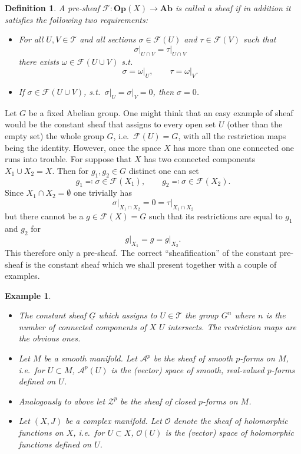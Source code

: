 \documentclass[11pt]{preprint}
\newtheorem{example}[lemma]{Example}
\newtheorem{defn}[lemma]{Definition}
\def\cA{\mathscr{A}}
\def\cZ{\mathscr{Z}}
\def\Op{\mathord{\mathbf{Op}}}
\def\Ab{\mathord{\mathbf{Ab}}}
\numberwithin{equation}{section}
\begin{document}
\begin{defn}
   A pre-sheaf $\mathcal F : \Op(X) \to \Ab$ is called a \textit{sheaf} if in addition it satisfies the following two requirements: 
   \begin{itemize}
     \item For all $U,V \in \mathcal T$ and all sections $\sigma \in \mathcal F(U)$ and $\tau \in \mathcal F(V)$ such that
     \[
        \sigma\big|_{U \cap V} = \tau \big|_{U \cap V}  
     \]
     there exists $\omega \in \mathcal F(U \cup V)$ s.t.\ 
     \[
        \sigma = \omega\big|_{U}, \qquad \tau = \omega\big|_{V}.  
     \]
     \item If $\sigma \in \mathcal F(U\cup V) $, s.t.\ $\sigma\big|_U = \sigma\big|_V = 0$, then $\sigma = 0$.
   \end{itemize}
\end{defn}

Let $G$ be a fixed Abelian group. One might think that an easy example of sheaf would be the constant sheaf that assigns to every open set $U$ (other than the empty set) the whole group $G$, i.e.\ $\mathcal F(U) = G$, with all the restriction maps being the identity. However, once the space $X$ has more than one connected one runs into trouble. For suppose that $X$ has two connected components $X_1 \cup X_2 = X$. Then for $g_1, g_2 \in G$ distinct one can set 
\[
  g_1 \eqqcolon \sigma \in \mathcal F(X_1), \qquad  g_2 \eqqcolon \sigma \in \mathcal F(X_2).  
\]
Since $X_1 \cap X_2 = \emptyset$ one trivially has
\[
  \sigma\big|_{X_1 \cap X_2}  = 0 = \tau\big|_{X_1 \cap X_2} 
\]
but there cannot be a $g \in \mathcal F(X) = G$ such that its restrictions are equal to $g_1$ and $g_2$ for
\[
  g\big|_{X_1} = g = g\big|_{X_2}.  
\]
This therefore only a pre-sheaf. The correct ``sheafification'' of the constant pre-sheaf is the constant sheaf which we shall present together with a couple of examples.

\begin{example}
  \begin{itemize}
    \item The constant sheaf $\underline{G}$ which assigns to $U \in \mathcal T$ the group $G^{n}$ where $n$ is the number of connected components of $X$ $U$ intersects. The restriction maps are the obvious ones. 
    \item Let $M$ be a smooth manifold. Let $\cA^p$ be the sheaf of smooth $p$-forms on $M$, i.e.\ for $U \subset M$, $\cA^p(U)$ is the (vector) space of smooth, real-valued $p$-forms defined on $U$.
    \item Analogously to above let $\cZ^p$ be the sheaf of closed $p$-forms on $M$.
    \item Let $(X,J)$ be a complex manifold. Let $\mathscr O$ denote the sheaf of holomorphic functions on $X$, i.e.\ for $U \subset X$, $\mathscr O(U)$ is the (vector) space of holomorphic functions defined on $U$.
  \end{itemize}
\end{example}
\end{document}
